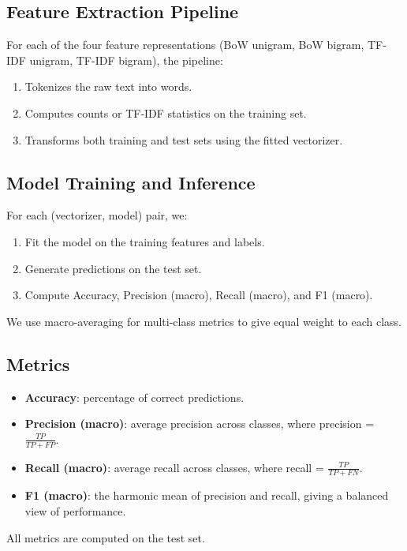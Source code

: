 \documentclass[12pt]{article}
\begin{document}
\subsection{Feature Extraction Pipeline}
For each of the four feature representations (BoW unigram, BoW bigram, TF-IDF unigram, TF-IDF bigram), the pipeline:
\begin{enumerate}
  \item Tokenizes the raw text into words.
  \item Computes counts or TF-IDF statistics on the training set.
  \item Transforms both training and test sets using the fitted vectorizer.
\end{enumerate}

\subsection{Model Training and Inference}
For each (vectorizer, model) pair, we:
\begin{enumerate}
  \item Fit the model on the training features and labels.
  \item Generate predictions on the test set.
  \item Compute Accuracy, Precision (macro), Recall (macro), and F1 (macro).
\end{enumerate}
We use macro-averaging for multi-class metrics to give equal weight to each class.

\subsection{Metrics}
\begin{itemize}
  \item \textbf{Accuracy}: percentage of correct predictions.
  \item \textbf{Precision (macro)}: average precision across classes, where precision = $\frac{TP}{TP+FP}$.
  \item \textbf{Recall (macro)}: average recall across classes, where recall = $\frac{TP}{TP+FN}$.
  \item \textbf{F1 (macro)}: the harmonic mean of precision and recall, giving a balanced view of performance.
\end{itemize}
All metrics are computed on the test set.
\end{document}
